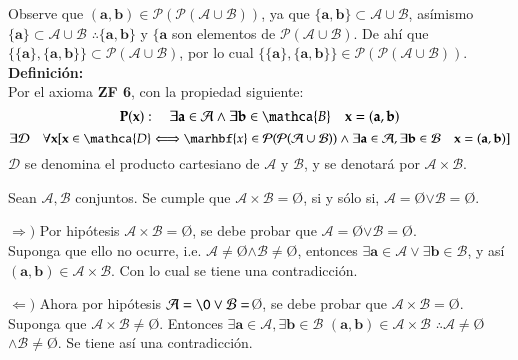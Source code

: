 Observe que $(\mathbf{a,b})\in\mathcal{P}(\mathcal{P}(\mathcal{A}\cup\mathcal{B}))$, ya que $\{\mathbf{a,b}\}\subset\mathcal{A}\cup\mathcal{B}$,
asímismo $\{\mathbf{a}\}\subset\mathcal{A}\cup\mathcal{B}$ $\therefore \{\mathbf{a,b}\}$ y $\{\mathbf{a}$ son elementos de 
$\mathcal{P}(\mathcal{A}\cup\mathcal{B})$. De ahí que $\{\{\mathbf{a}\}, \{\mathbf{a,b}\}\}\subset\mathcal{P}(\mathcal{A}\cup\mathcal{B})$, por 
lo cual $\{\{\mathbf{a}\},\{\mathbf{a,b}\}\}\in\mathcal{P}(\mathcal{P}(\mathcal{A}\cup\mathcal{B}))$.\\

\textbf{Definición:}\\
Por el axioma \textbf{ZF 6}, con la propiedad siguiente:
\[ \mathbf{P}(\mathbf{x}):\quad\exists\mathbf{a}\in\mathcal{A}\wedge\exists\mathbf{b}\in\mathca{B}\quad\mathbf{x}=(\mathbf{a,b})\]
\[ \exists\mathcal{D}\quad\forall\mathbf{x}[\mathbf{x}\in\mathca{D} \Longleftrightarrow\marhbf{x}\in\mathcal{P}(\mathcal{P}(\mathcal{A}\cup\mathcal{B}))\wedge\exists\mathbf{a}\in\mathcal{A},\exists\mathbf{b}\in\mathcal{B}\quad\mathbf{x}=(\mathbf{a,b})]\]
$\mathcal{D}$ se denomina el producto cartesiano de $\mathcal{A}$ y $\mathcal{B}$, y se denotará por $\mathcal{A}\times\mathcal{B}$.\\

\begin{proposition}
Sean $\mathcal{A,B}$ conjuntos. Se cumple que $\mathcal{A}\times\mathcal{B}=$\O, si y sólo si, $\mathcal{A}=$\O$\vee\mathcal{B}=$\O.
\end{proposition}
\begin{proof2}
	
	$\Longrightarrow)$ Por hipótesis $\mathcal{A}\times\mathcal{B}=$\O, se debe probar que $\mathcal{A}=$\O$\vee\mathcal{B}=$\O.\\
	Suponga que ello no ocurre, i.e. $\mathcal{A}\neq$\O$\wedge\mathcal{B}\neq$\O, entonces $\exists\mathbf{a}\in\mathcal{A}\vee\exists\mathbf{b}\in\mathcal{B}$,
	y así $(\mathbf{a,b})\in\mathcal{A}\times\mathcal{B}$. Con lo cual se tiene una contradicción.

	$\Longleftarrow)$ Ahora por hipótesis $\mathcal{A}=\O\vee\mathcal{B}=$\O, se debe probar que $\mathcal{A}\times\mathcal{B}=$\O. Suponga que 
	$\mathcal{A}\times\mathcal{B}\neq$\O. Entonces $\exists\mathbf{a}\in\mathcal{A},\exists\mathbf{b}\in\mathcal{B}$ 
	$(\mathbf{a,b})\in\mathcal{A}\times\mathcal{B}$ $\therefore \mathcal{A}\neq$\O$\wedge\mathcal{B}\neq$\O. Se tiene así una contradicción.

\end{proof2}

